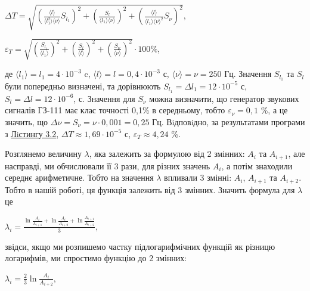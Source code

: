 \documentclass[12pt,a4paper]{article}
\begin{document}
    \begin{center}

        $\displaystyle \Delta T = \sqrt{\left( \frac{\text{⟨}l\text{⟩}}{\text{⟨}l_1^2\text{⟩} \text{⟨}\nu\text{⟩}} S_{l_1} \right)^2 + \left( \frac{S_l}{\text{⟨}l_1\text{⟩} \text{⟨}\nu\text{⟩}} \right)^2 + \left(\frac{\text{⟨}l\text{⟩}}{\text{⟨}l_1\text{⟩} \text{⟨}\nu\text{⟩}^2} S_{\nu}  \right)^2}$,

    \end{center}

    \begin{center}

        $\displaystyle \varepsilon_T = \sqrt{\left( \frac{S_{l_1}}{\text{⟨}l_1\text{⟩}} \right)^2 + \left( \frac{S_l}{\text{⟨}l\text{⟩}} \right)^2 + \left( \frac{S_{\nu }}{\text{⟨}\nu \text{⟩}} \right)^2} \cdot 100 \%$,

    \end{center}

    де $\text{⟨}l_1\text{⟩} = l_1 = 4 \cdot 10^{-3}$ c, $\text{⟨}l\text{⟩} = l = 0,4 \cdot 10^{-3}$ с, $\text{⟨}\nu\text{⟩} = \nu = 250$ Гц. Значення $S_{l_1}$ та $S_l$ були попередньо визначені, та дорівнюють $S_{l_1} = \Delta l_1 = 12 \cdot 10^{-5}$ с, $S_l = \Delta l = 12 \cdot 10^{-6}$, с.
    Значення для $S_{\nu}$ можна визначити, що генератор звукових сигналів ГЗ-111 має клас точності 0,1\% в середньому, тобто $\varepsilon_{\nu} = 0,1$ \%, а це значить, що $\Delta \nu = S_{\nu} = \nu \cdot 0,001 = 0,25$ Гц.
    Вiдповiдно, за результатами програми з \hyperlink{listing2}{Лiстингу 3.2}, $\Delta T \approx 1,69 \cdot 10^{-5}$ с, $\varepsilon_T \approx 4,24$ \%.

    Розглянемо величину $\lambda$, яка залежить за формулою від 2 змінних: $A_i$ та $A_{i+1}$, але насправді, ми обчислювали її 3 рази, для різних значень $A_i$, а потім знаходили середнє арифметичне.
    Тобто на значення $\lambda$ впливали 3 змінні: $A_i$, $A_{i+1}$ та $A_{i+2}$. Тобто в нашій роботі, ця функція залежить від 3 змінних.
    Значить формула для $\lambda$ це 

    \begin{center}
        $\displaystyle \lambda_i = \frac{\ln \frac{A_i}{A_{i+1}} + \ln \frac{A_i}{A_{i+2}} + \ln \frac{A_{i+1}}{A_{i+2}}}{3}$,
    \end{center}

    звідси, якщо ми розпишемо частку підлогарифмічних функцій як різницю логарифмів, ми спростимо функцію до 2 змінних:

    \begin{center}
        $\displaystyle \lambda_i = \frac{2}{3} \ln \frac{A_i}{A_{i+2}}$,
    \end{center}
\end{document}
